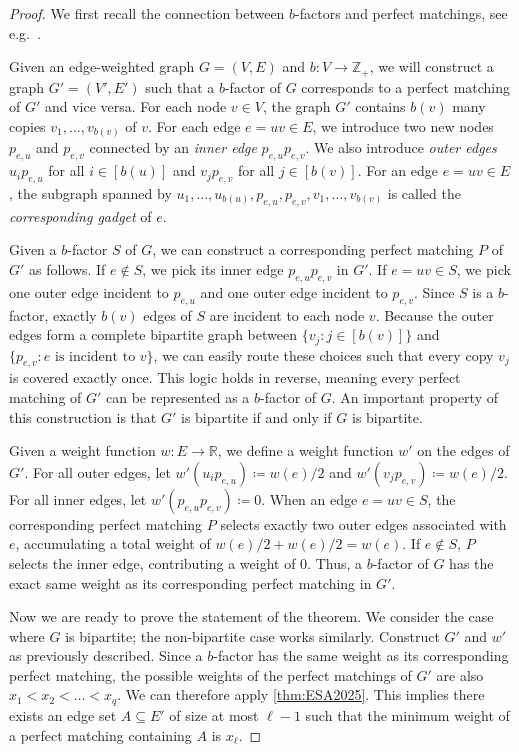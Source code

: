 \documentclass{article}
\theoremstyle{plain}
\theoremstyle{definition}
\begin{document}
\begin{proof}
    We first recall the connection between $b$-factors and perfect matchings, see e.g.~\cite{schrijver2003combinatorial}.
    
    Given an edge-weighted graph $G = (V, E)$ and $b\colon V \rightarrow \mathbb{Z}_+$, we will construct a graph $G' = (V', E')$ such that a $b$-factor of $G$ corresponds to a perfect matching of $G'$ and vice versa. For each node $v\in V$, the graph $G'$ contains $b(v)$ many copies $v_{1}, \dots, v_{b(v)}$ of $v$. For each edge $e = uv \in E$, we introduce two new nodes $p_{e, u}$ and $p_{e, v}$ connected by an \emph{inner edge} $p_{e, u}p_{e, v}$. We also introduce \emph{outer edges} $u_{i}p_{e, u}$ for all $i \in [b(u)]$ and $v_{j}p_{e, v}$ for all $j \in [b(v)]$. For an edge $e = uv \in E$, the subgraph spanned by $u_{1}, \dots , u_{b(u)}, p_{e, u}, p_{e, v}, v_{1}, \dots , v_{b(v)}$ is called the \emph{corresponding gadget} of $e$. 
    
    Given a $b$-factor $S$ of $G$, we can construct a corresponding perfect matching $P$ of $G'$ as follows. If $e \notin S$, we pick its inner edge $p_{e, u}p_{e, v}$ in $G'$. If $e = uv \in S$, we pick one outer edge incident to $p_{e, u}$ and one outer edge incident to $p_{e, v}$. Since $S$ is a $b$-factor, exactly $b(v)$ edges of $S$ are incident to each node $v$. Because the outer edges form a complete bipartite graph between $\{v_{j} \colon j \in [b(v)]\}$ and $\{p_{e, v} \colon e \text{ is incident to } v\}$, we can easily route these choices such that every copy $v_j$ is covered exactly once. This logic holds in reverse, meaning every perfect matching of $G'$ can be represented as a $b$-factor of $G$. An important property of this construction is that $G'$ is bipartite if and only if $G$ is bipartite. 
    
    Given a weight function $w\colon E \rightarrow \mathbb{R}$, we define a weight function $w'$ on the edges of $G'$. For all outer edges, let $w'(u_{i}p_{e, u}) \coloneqq w(e)/2$ and $w'(v_{j}p_{e, v}) \coloneqq w(e)/2$. For all inner edges, let $w'(p_{e, u}p_{e, v}) \coloneqq 0$. When an edge $e=uv \in S$, the corresponding perfect matching $P$ selects exactly two outer edges associated with $e$, accumulating a total weight of $w(e)/2 + w(e)/2 = w(e)$. If $e \notin S$, $P$ selects the inner edge, contributing a weight of $0$. Thus, a $b$-factor of $G$ has the exact same weight as its corresponding perfect matching in $G'$.
    
    Now we are ready to prove the statement of the theorem. We consider the case where $G$ is bipartite; the non-bipartite case works similarly. Construct $G'$ and $w'$ as previously described. Since a  $b$-factor has the same weight as its corresponding perfect matching, the possible weights of the perfect matchings of $G'$ are also $x_{1} < x_{2} < \dots < x_{q}$. We can therefore apply \cref{thm:ESA2025}. This implies there exists an edge set $A \subseteq E'$ of size at most $\ell-1$ such that the minimum weight of a perfect matching containing $A$ is $x_{\ell}$. 
    

\end{proof}
\end{document}
